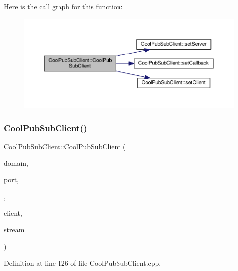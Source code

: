 Here is the call graph for this function\+:
\nopagebreak
\begin{figure}[H]
\begin{center}
\leavevmode
\includegraphics[width=350pt]{class_cool_pub_sub_client_a2aea0a9487dc15b9db1caf0f069eb877_cgraph}
\end{center}
\end{figure}
\mbox{\label{class_cool_pub_sub_client_a6466f55abe5820d410b1c9cf7a70ec7e}} 
\subsubsection{\texorpdfstring{Cool\+Pub\+Sub\+Client()}{CoolPubSubClient()}\hspace{0.1cm}{\footnotesize\ttfamily [14/14]}}
{\footnotesize\ttfamily Cool\+Pub\+Sub\+Client\+::\+Cool\+Pub\+Sub\+Client (\begin{DoxyParamCaption}\item[{const char $\ast$}]{domain,  }\item[{uint16\+\_\+t}]{port,  }\item[{\hyperlink{class_cool_pub_sub_client_a021ec75e9fbaf658370b8005ccfddc14}{M\+Q\+T\+T\+\_\+\+C\+A\+L\+L\+B\+A\+C\+K\+\_\+\+S\+I\+G\+N\+A\+T\+U\+RE}}]{,  }\item[{Client \&}]{client,  }\item[{Stream \&}]{stream }\end{DoxyParamCaption})}



Definition at line 126 of file Cool\+Pub\+Sub\+Client.\+cpp.

